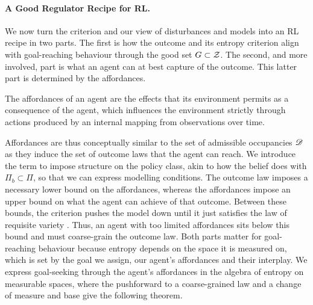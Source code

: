 \paragraph{A Good Regulator Recipe for RL.}
We now turn the criterion and our view of disturbances and models into an RL recipe in two parts.
The first is how the outcome and its entropy criterion align with goal-reaching behaviour through the good set $G \subset \mathcal Z$.
The second, and more involved, part is what an agent can at best capture of the outcome.
This latter part is determined by the affordances.
\begin{definition}\label{def:affordances}
  The affordances of an agent are the effects that its environment permits as a consequence of the agent, which influences the environment strictly through actions produced by an internal mapping from observations over time.
\end{definition}
Affordances are thus conceptually similar to the set of admissible occupancies $\mathscr D$ as they induce the set of outcome laws that the agent can reach.
We introduce the term to impose structure on the policy class, akin to how the belief does with $\Pi_b \subset \Pi$, so that we can express modelling conditions.
The outcome law imposes a necessary lower bound on the affordances, whereas the affordances impose an upper bound on what the agent can achieve of that outcome.
Between these bounds, the criterion pushes the model down until it just satisfies the law of requisite variety \citep{Ashby-introduction56}.
Thus, an agent with too limited affordances sits below this bound and must coarse-grain the outcome law.
Both parts matter for goal-reaching behaviour because entropy depends on the space it is measured on, which is set by the goal we assign, our agent's affordances and their interplay.
We express goal-seeking through the agent's affordances in the algebra of entropy on measurable spaces, where the pushforward to a coarse-grained law and a change of measure and base give the following theorem.
